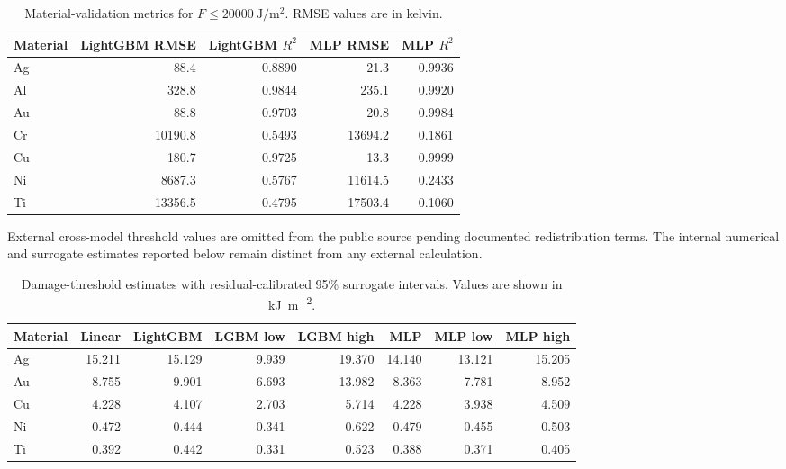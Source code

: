 \begin{table}[htbp]
    \centering
    \caption{Material-validation metrics for $F\leq\SI{20000}{\joule\per\metre\squared}$. RMSE values are in kelvin.}
    \label{tab:ch4-material-metrics}
    \small
    \begin{tabular}{lrrrr}
        \toprule
        Material & LightGBM RMSE & LightGBM $R^2$ & MLP RMSE & MLP $R^2$ \\
        \midrule
        Ag       & 88.4          & 0.8890         & 21.3     & 0.9936    \\
        Al       & 328.8         & 0.9844         & 235.1    & 0.9920    \\
        Au       & 88.8          & 0.9703         & 20.8     & 0.9984    \\
        Cr       & 10190.8       & 0.5493         & 13694.2  & 0.1861    \\
        Cu       & 180.7         & 0.9725         & 13.3     & 0.9999    \\
        Ni       & 8687.3        & 0.5767         & 11614.5  & 0.2433    \\
        Ti       & 13356.5       & 0.4795         & 17503.4  & 0.1060    \\
        \bottomrule
    \end{tabular}
\end{table}

External cross-model threshold values are omitted from the public source pending documented redistribution terms. The internal numerical and surrogate estimates reported below remain distinct from any external calculation.

\begin{table}[htbp]
    \centering
    \caption{Damage-threshold estimates with residual-calibrated 95\% surrogate intervals. Values are shown in \si{\kilo\joule\per\metre\squared}.}
    \label{tab:ch4-threshold-intervals}
    \scriptsize
    \begin{tabular}{lrrrrrrr}
        \toprule
        Material & Linear & LightGBM & LGBM low & LGBM high & MLP    & MLP low & MLP high \\
        \midrule
        Ag       & 15.211 & 15.129   & 9.939    & 19.370    & 14.140 & 13.121  & 15.205   \\
        Au       & 8.755  & 9.901    & 6.693    & 13.982    & 8.363  & 7.781   & 8.952    \\
        Cu       & 4.228  & 4.107    & 2.703    & 5.714     & 4.228  & 3.938   & 4.509    \\
        Ni       & 0.472  & 0.444    & 0.341    & 0.622     & 0.479  & 0.455   & 0.503    \\
        Ti       & 0.392  & 0.442    & 0.331    & 0.523     & 0.388  & 0.371   & 0.405    \\
        \bottomrule
    \end{tabular}
\end{table}

